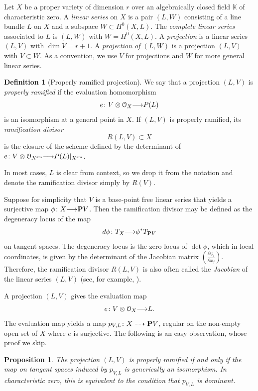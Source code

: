 \documentclass[11pt,reqno]{amsart}
\theoremstyle{plain}
\newtheorem{proposition}[theorem]{Proposition}
\theoremstyle{definition}
\newtheorem{definition}[theorem]{Definition}
\theoremstyle{remark}
\numberwithin{equation}{section}
\renewcommand{\k}{\mathbb{K}}
\renewcommand{\to}{{\longrightarrow}}
\numberwithin{equation}{section}
\renewcommand{\O}{\mathcal O}
\begin{document}
Let $X$ be a proper variety of dimension $r$ over an algebraically closed field $\k$ of characteristic zero.
A \emph{linear series} on $X$ is a pair $(L, W)$ consisting of a line bundle $L$ on $X$ and a subspace $W \subset H^0(X, L)$.
The \emph{complete linear series} associated to $L$ is $(L, W)$ with $W = H^0(X, L)$.
A \emph{projection} is a linear series $(L, V)$ with $\dim V = r+1$.
A \emph{projection of $(L, W)$} is a projection $(L, V)$ with $V \subset W$.
As a convention, we use $V$ for projections and $W$ for more general linear series.

\begin{definition}[Properly ramified projection]
  \label{def:properlyramified}
We say that a projection $(L,V)$ is \emph{properly ramified} if the evaluation homomorphism
\[e \from V \otimes \O_{X} \to P(L)\]
is an isomorphism at a general point in $X$.  If $(L,V)$ is properly ramified, its \emph{ramification divisor}
\[R(L,V) \subset X\]
is the closure of the scheme defined by the determinant of $e \from V \otimes \O_{X^{\rm sm}} \to P(L)|_{X^{\rm sm}}$.
\end{definition}
In most cases, $L$ is clear from context, so we drop it from the notation and denote the ramification divisor simply by $R(V)$.
\begin{remark}\label{rem:Jacobian}
  Suppose for simplicity that $V$ is a base-point free linear series that yields a surjective map $\phi \from X \to \P V$.
  Then the ramification divisor may be defined as the degeneracy locus of the map
  \[ d \phi \from T_{X} \to \phi^* T_{\P V}\]
  on tangent spaces.
  The degeneracy locus is the zero locus of $\det \phi$, which in local coordinates, is given by the determinant of the Jacobian matrix $\left( \frac{\partial \phi_i}{\partial x_j} \right)$.
  Therefore, the ramification divisor $R(L, V)$ is also often called the \emph{Jacobian} of the linear series $(L, V)$ (see, for example, \cite[1.1.7]{dol:12}).
\end{remark}

A projection $(L, V)$ gives the evaluation map
\[e \from V \otimes \O_X \to L.\]
The evaluation map yields a map $p_{V,L} {\colon} X \dashrightarrow {\bf P} V$, regular on the non-empty open set of $X$ where $e$ is surjective.
The following is an easy observation, whose proof we skip.
\begin{proposition}\label{prop:proj}
  The projection $(L, V)$ is properly ramified if and only if the map on tangent spaces induced by $p_{V,L}$ is generically an isomorphism.
  In characteristic zero, this is equivalent to the condition that $p_{V,L}$ is dominant.
\end{proposition}
\end{document}
